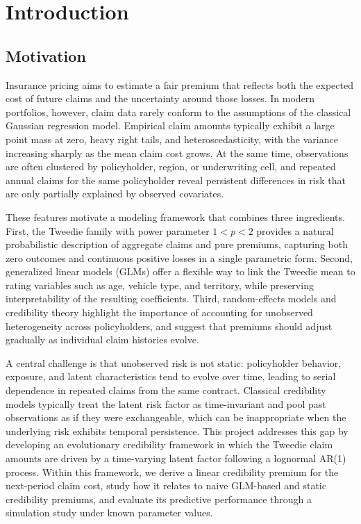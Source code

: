 \documentclass{sfuthesis}
\numberwithin{equation}{chapter}
\begin{document}
%
\tableofcontents%
\clearpage

%
\listoftables%
\clearpage

%
\listoffigures%
\clearpage

\mainmatter

\chapter{Introduction}

\section{Motivation}

Insurance pricing aims to estimate a fair premium that reflects both the
expected cost of future claims and the uncertainty around those losses.
In modern portfolios, however, claim data rarely conform to the
assumptions of the classical Gaussian regression model. Empirical claim amounts typically exhibit a large point mass at zero, heavy right
tails, and heteroscedasticity, with the variance increasing sharply as
the mean claim cost grows. At the same time, observations are often
clustered by policyholder, region, or underwriting cell, and repeated
annual claims for the same policyholder reveal persistent differences in
risk that are only partially explained by observed covariates.

These features motivate a modeling framework that combines three
ingredients. First, the Tweedie family with power parameter
\(1 < p < 2\) provides a natural probabilistic description of aggregate
claims and pure premiums, capturing both zero outcomes and continuous
positive losses in a single parametric form. Second, generalized linear
models (GLMs) offer a flexible way to link the Tweedie mean to rating
variables such as age, vehicle type, and territory, while preserving
interpretability of the resulting coefficients. Third, random-effects
models and credibility theory highlight the importance of accounting
for unobserved heterogeneity across policyholders, and suggest that
premiums should adjust gradually as individual claim histories evolve.

A central challenge is that unobserved risk is not static: policyholder
behavior, exposure, and latent characteristics tend to evolve over time,
leading to serial dependence in repeated claims from the same contract.
Classical credibility models typically treat the latent risk factor as
time-invariant and pool past observations as if they were exchangeable,
which can be inappropriate when the underlying risk exhibits temporal
persistence. This project addresses this gap by developing an
evolutionary credibility framework in which the Tweedie claim
amounts are driven by a time-varying latent factor following a lognormal
AR(1) process. Within this framework, we derive a linear credibility
premium for the next-period claim cost, study how it relates to naive
GLM-based and static credibility premiums, and evaluate its predictive
performance through a simulation study under known parameter values.
\end{document}
